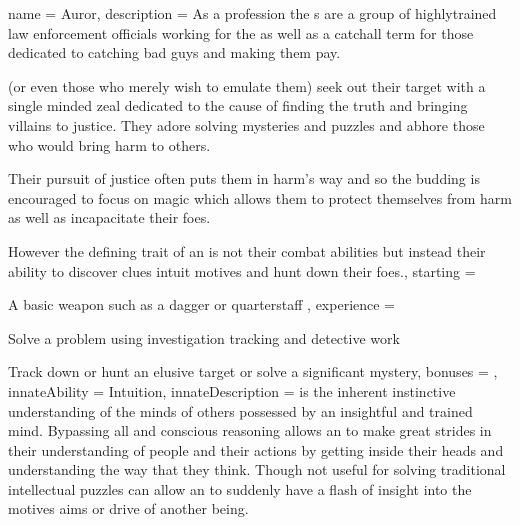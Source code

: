 \archetype
{
	name = Auror,
	description = As a profession\comma{} the \auror{}s are a group of highly\minus{}trained law enforcement officials working for the \comma{} as well as a catchall term for those dedicated to catching bad guys and making them pay.

 (or even those who merely wish to emulate them) seek out their target with a single minded zeal\comma{} dedicated to the cause of finding the truth and bringing villains to justice. They adore solving mysteries and puzzles\comma{} and abhore those who would bring harm to others. 

Their pursuit of justice often puts them in harm's way\comma{} and so the budding \auror{} is encouraged to focus on magic which allows them to protect themselves from harm\comma{} as well as incapacitate their foes. 

However\comma{} the defining trait of an \auror{} is not their combat abilities but instead their ability to discover clues\comma{} intuit motives and hunt down their foes.,
	starting = 
\item A basic weapon such as a dagger or quarterstaff
,
	experience = \item Solve a problem using investigation\comma{} tracking and detective work
\item Track down or hunt an elusive target or solve a significant mystery,
	bonuses = 
,
	innateAbility = Intuition,
	innateDescription = \imp{\innateAbility} is the inherent\comma{} instinctive understanding of the minds of others possessed by an insightful and trained mind. Bypassing all  and conscious reasoning\comma{}  allows an \name{} to make great strides in their understanding of people and their actions by getting inside their heads and understanding the way that they think. Though not useful for solving traditional intellectual puzzles\comma{} \imp{\innateAbility} can allow an \bname{} to suddenly have a flash of insight into the motives\comma{} aims or drive of another being. 

}
